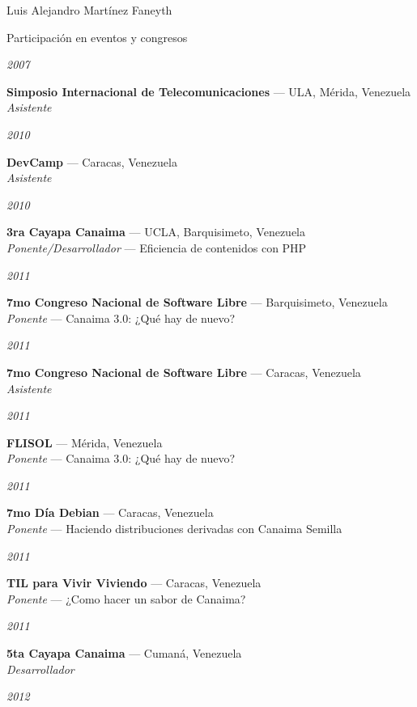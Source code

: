 \documentclass[11pt,letterpaper]{article}
\begin{document}
\begin{cv}{Luis Alejandro Mart\'inez Faneyth}
\begin{cvlist}{Participaci\'on en eventos y congresos}
\item[{\parbox[t]{6em}{\textit{\large{2007}}}}]{
	\parbox[t]{\linewidth}{
		\textbf{Simposio Internacional de Telecomunicaciones} --- ULA, M\'erida, Venezuela\\
		\textit{Asistente}
	}
}
\item[{\parbox[t]{6em}{\textit{\large{2010}}}}]{
	\parbox[t]{\linewidth}{
		\textbf{DevCamp} --- Caracas, Venezuela\\
		\textit{Asistente}
	}
}
\item[{\parbox[t]{6em}{\textit{\large{2010}}}}]{
	\parbox[t]{\linewidth}{
		\textbf{3ra Cayapa Canaima} --- UCLA, Barquisimeto, Venezuela\\
		\textit{Ponente/Desarrollador} --- Eficiencia de contenidos con PHP
	}
}
\item[{\parbox[t]{6em}{\textit{\large{2011}}}}]{
	\parbox[t]{\linewidth}{
		\textbf{7mo Congreso Nacional de Software Libre} --- Barquisimeto, Venezuela\\
		\textit{Ponente} --- Canaima 3.0: ¿Qu\'e hay de nuevo?
	}
}
\item[{\parbox[t]{6em}{\textit{\large{2011}}}}]{
	\parbox[t]{\linewidth}{
		\textbf{7mo Congreso Nacional de Software Libre} --- Caracas, Venezuela\\
		\textit{Asistente}
	}
}
\item[{\parbox[t]{6em}{\textit{\large{2011}}}}]{
	\parbox[t]{\linewidth}{
		\textbf{FLISOL} --- M\'erida, Venezuela\\
		\textit{Ponente} --- Canaima 3.0: ¿Qu\'e hay de nuevo?
	}
}
\item[{\parbox[t]{6em}{\textit{\large{2011}}}}]{
	\parbox[t]{\linewidth}{
		\textbf{7mo D\'ia Debian} --- Caracas, Venezuela\\
		\textit{Ponente} --- Haciendo distribuciones derivadas con Canaima Semilla
	}
}
\item[{\parbox[t]{6em}{\textit{\large{2011}}}}]{
	\parbox[t]{\linewidth}{
		\textbf{TIL para Vivir Viviendo} --- Caracas, Venezuela\\
		\textit{Ponente} --- ¿Como hacer un sabor de Canaima?
	}
}
\item[{\parbox[t]{6em}{\textit{\large{2011}}}}]{
	\parbox[t]{\linewidth}{
		\textbf{5ta Cayapa Canaima} --- Cuman\'a, Venezuela\\
		\textit{Desarrollador}
	}
}
\item[{\parbox[t]{6em}{\textit{\large{2012}}}}]{
	\parbox[t]{\linewidth}{
}}
\end{cvlist}
\end{cv}
\end{document}
